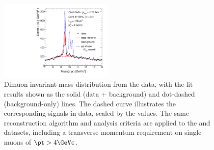 \begin{figure}[hbtp]
  \begin{center}
    \includegraphics[angle=0,width=0.5\textwidth]{figures/fulldataset/overlay5_masspeak_Hi.pdf}
    \caption{Dimuon invariant-mass distribution from the \PbPb data, with the fit results shown as the solid (data + background) and dot-dashed (background-only) lines. The dashed curve illustrates the corresponding signals in \pp data, scaled by the \raa values. The same reconstruction algorithm and analysis criteria are applied to the \PbPb and \pp datasets, including a transverse momentum requirement on single muons of $\pt > 4 \GeVc$. }
    \label{fig:PRplot_raa}
  \end{center}
\end{figure}



\vfill


